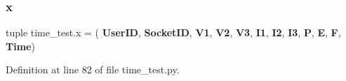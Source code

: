 \subsubsection{x}
{\footnotesize\ttfamily tuple time\+\_\+test.\+x = (\textquotesingle{}\textbf{ User\+ID}\textquotesingle{}, \textquotesingle{}\textbf{ Socket\+ID}\textquotesingle{}, \textquotesingle{}\textbf{ V1}\textquotesingle{}, \textquotesingle{}\textbf{ V2}\textquotesingle{}, \textquotesingle{}\textbf{ V3}\textquotesingle{}, \textquotesingle{}\textbf{ I1}\textquotesingle{}, \textquotesingle{}\textbf{ I2}\textquotesingle{}, \textquotesingle{}\textbf{ I3}\textquotesingle{}, \textquotesingle{}\textbf{ P}\textquotesingle{}, \textquotesingle{}\textbf{ E}\textquotesingle{}, \textquotesingle{}\textbf{ F}\textquotesingle{}, \textquotesingle{}\textbf{ Time}\textquotesingle{})}



Definition at line 82 of file time\+\_\+test.\+py.

